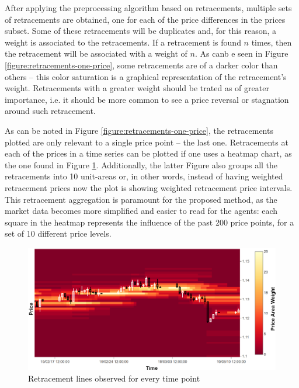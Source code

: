 After applying the preprocessing algorithm based on retracements, multiple sets
of retracements are obtained, one for each of the price differences in the
prices subset. Some of these retracements will be duplicates and, for this
reason, a weight is associated to the retracements. If a retracement is found
$n$ times, then the retracement will be associated with a weight of $n$. As canb
e seen in Figure \ref{figure:retracements-one-price}, some retracements are of a
darker color than others -- this color saturation is a graphical representation
of the retracement's weight. Retracements with a greater weight should be trated
as of greater importance, i.e. it should be more common to see a price reversal
or stagnation around such retracement.

As can be noted in Figure \ref{figure:retracements-one-price}, the retracements
plotted are only relevant to a single price point -- the last one. Retracements
at each of the prices in a time series can be plotted if one uses a heatmap
chart, as the one found in Figure
\ref{figure:retracements-all-prices}. Additionally, the latter Figure also
groups all the retracements into 10 unit-areas or, in other words, instead of
having weighted retracement prices now the plot is showing weighted retracement
price intervals. This retracement aggregation is paramount for the proposed
method, as the market data becomes more simplified and easier to read for the
agents: each square in the heatmap represents the influence of the past 200
price points, for a set of 10 different price levels.

\begin{figure}
\centering
\includegraphics[width=1.0\textwidth]{img/retracements-preprocessing-all-prices.png}
\caption{Retracement lines observed for every time point}
\label{figure:retracements-all-prices}
\end{figure}

